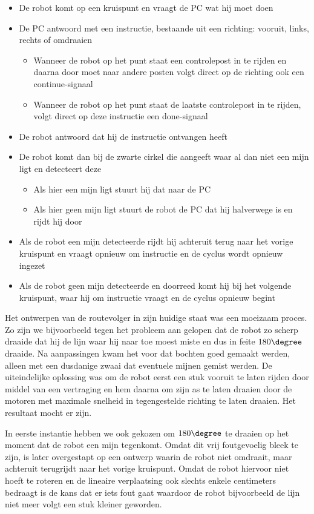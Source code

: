 \documentclass{report}
\begin{document}
\begin{itemize}
	\item De robot komt op een kruispunt en vraagt de PC wat hij moet doen
	\item De PC antwoord met een instructie, bestaande uit een richting: vooruit, links, rechts of omdraaien
		\begin{itemize}
			\item Wanneer de robot op het punt staat een controlepost in te rijden en daarna door moet naar andere posten volgt direct op de richting ook een continue-signaal
			\item Wanneer de robot op het punt staat de laatste controlepost in te rijden, volgt direct op deze instructie een done-signaal
		\end{itemize}
	\item De robot antwoord dat hij de instructie ontvangen heeft
	\item De robot komt dan bij de zwarte cirkel die aangeeft waar al dan niet een mijn ligt en detecteert deze
		\begin{itemize}
			\item Als hier een mijn ligt stuurt hij dat naar de PC
			\item Als hier geen mijn ligt stuurt de robot de PC dat hij halverwege is en rijdt hij door
		\end{itemize}
	\item Als de robot een mijn detecteerde rijdt hij achteruit terug naar het vorige kruispunt en vraagt opnieuw om instructie en de cyclus wordt opnieuw ingezet
	\item Als de robot geen mijn detecteerde en doorreed komt hij bij het volgende kruispunt, waar hij om instructie vraagt en de cyclus opnieuw begint
\end{itemize}

Het ontwerpen van de routevolger in zijn huidige staat was een moeizaam proces. Zo zijn we bijvoorbeeld tegen het probleem aan gelopen dat de robot zo scherp draaide dat hij de lijn waar hij naar toe moest miste en dus in feite $180\degree$ draaide. Na aanpassingen kwam het voor dat bochten goed gemaakt werden, alleen met een dusdanige zwaai dat eventuele mijnen gemist werden. De uiteindelijke oplossing was om de robot eerst een stuk vooruit te laten rijden door middel van een vertraging en hem daarna om zijn as te laten draaien door de motoren met maximale snelheid in tegengestelde richting te laten draaien. Het resultaat mocht er zijn.

In eerste instantie hebben we ook gekozen om $180\degree$ te draaien op het moment dat de robot een mijn tegenkomt. Omdat dit vrij foutgevoelig bleek te zijn, is later overgestapt op een ontwerp waarin de robot niet omdraait, maar achteruit terugrijdt naar het vorige kruispunt. Omdat de robot hiervoor niet hoeft te roteren en de lineaire verplaatsing ook slechts enkele centimeters bedraagt is de kans dat er iets fout gaat waardoor de robot bijvoorbeeld de lijn niet meer volgt een stuk kleiner geworden.
\end{document}
